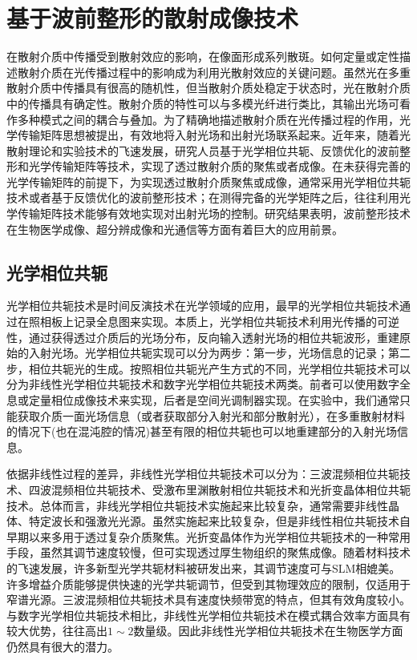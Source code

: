 \section{基于波前整形的散射成像技术}

在散射介质中传播受到散射效应的影响，在像面形成系列散斑。如何定量或定性描述散射介质在光传播过程中的影响成为利用光散射效应的关键问题。虽然光在多重散射介质中传播具有很高的随机性，但当散射介质处稳定于状态时，光在散射介质中的传播具有确定性。散射介质的特性可以与多模光纤进行类比，其输出光场可看作多种模式之间的耦合与叠加。为了精确地描述散射介质在光传播过程的作用，光学传输矩阵思想被提出，有效地将入射光场和出射光场联系起来。近年来，随着光散射理论和实验技术的飞速发展，研究人员基于光学相位共轭、反馈优化的波前整形和光学传输矩阵等技术，实现了透过散射介质的聚焦或者成像\cite{yaqoob_optical_2008,Vellekoop2007,vellekoop_exploiting_2010,conkey_genetic_2012,blochet_fast_2017,Popoff2010}。在未获得完善的光学传输矩阵的前提下，为实现透过散射介质聚焦或成像，通常采用光学相位共轭技术或者基于反馈优化的波前整形技术；在测得完备的光学矩阵之后，往往利用光学传输矩阵技术能够有效地实现对出射光场的控制。研究结果表明，波前整形技术在生物医学成像、超分辨成像和光通信等方面有着巨大的应用前景。

\subsection{光学相位共轭}

光学相位共轭技术是时间反演技术在光学领域的应用，最早的光学相位共轭技术通过在照相板上记录全息图来实现\cite{derode_robust_1995,draeger_one_channel_1997,leith_holographic_1966,fink_acoustic_2001}。本质上，光学相位共轭技术利用光传播的可逆性，通过获得透过介质后的光场分布，反向输入透射光场的相位共轭波形，重建原始的入射光场。光学相位共轭实现可以分为两步：第一步，光场信息的记录；第二步，相位共轭光的生成。按照相位共轭光产生方式的不同，光学相位共轭技术可以分为非线性光学相位共轭技术和数字光学相位共轭技术两类\cite{fisher_optical_2012}。前者可以使用数字全息或定量相位成像技术来实现，后者是空间光调制器实现。在实验中，我们通常只能获取介质一面光场信息（或者获取部分入射光和部分散射光），在多重散射材料的情况下(也在混沌腔的情况)甚至有限的相位共轭也可以地重建部分的入射光场信息。

依据非线性过程的差异，非线性光学相位共轭技术可以分为：三波混频相位共轭技术\cite{voronin_compensation_1979}、四波混频相位共轭技术\cite{bloom_conjugate_1977,yariv_amplified_1977}、受激布里渊散射相位共轭技术\cite{kralikova_image_1997}和光折变晶体相位共轭技术\cite{karaguleff_optical_1990}。总体而言，非线光学相位共轭技术实施起来比较复杂，通常需要非线性晶体、特定波长和强激光光源。虽然实施起来比较复杂，但是非线性相位共轭技术自早期以来多用于透过复杂介质聚焦。光折变晶体作为光学相位共轭技术的一种常用手段，虽然其调节速度较慢，但可实现透过厚生物组织的聚焦成像。随着材料技术的飞速发展，许多新型光学共轭材料被研发出来，其调节速度可与SLM相媲美。许多增益介质能够提供快速的光学共轭调节，但受到其物理效应的限制，仅适用于窄谱光源。三波混频相位共轭技术具有速度快频带宽的特点，但其有效角度较小。与数字光学相位共轭技术相比，非线性光学相位共轭技术在模式耦合效率方面具有较大优势\cite{fink_acoustic_2001}，往往高出$1 \sim 2$数量级。因此非线性光学相位共轭技术在生物医学方面仍然具有很大的潜力。

